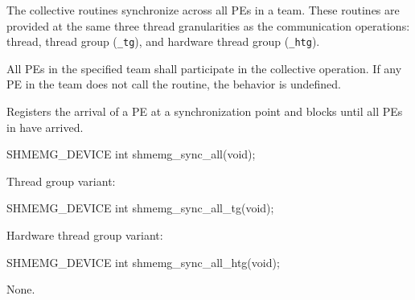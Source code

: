 
The collective routines synchronize across all \acp{PE} in a team. These routines
are provided at the same three thread granularities as the communication
operations: thread, thread group (\texttt{\_tg}), and hardware thread group
(\texttt{\_htg}).

All \acp{PE} in the specified team shall participate in the collective operation.
If any \ac{PE} in the team does not call the routine, the behavior is undefined.

\label{subsec:gc_sync_all}

Registers the arrival of a \ac{PE} at a synchronization point and blocks until
all \acp{PE} in  have arrived.

\begin{apidefinition}
\begin{Csynopsis}
SHMEMG_DEVICE int shmemg_sync_all(void);
\end{Csynopsis}

Thread group variant:
\begin{CsynopsisCol}
SHMEMG_DEVICE int shmemg_sync_all_tg(void);
\end{CsynopsisCol}

Hardware thread group variant:
\begin{CsynopsisCol}
SHMEMG_DEVICE int shmemg_sync_all_htg(void);
\end{CsynopsisCol}

\begin{apiarguments}
None.
\end{apiarguments}


\end{apidefinition}

